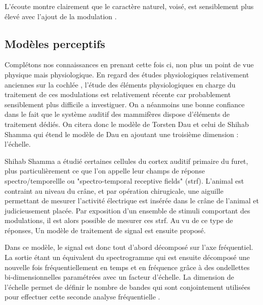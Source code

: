 L'écoute montre clairement que le caractère naturel, voisé, est sensiblement plus élevé avec l'ajout de la modulation .

\subsection{Modèles perceptifs}

Complétons nos connaissances en prenant cette fois ci, non plus un point de vue physique mais physiologique. En regard des études physiologiques relativement anciennes sur la cochlée \cite{}, l'étude des éléments physiologiques en charge du traitement de ces modulations est relativement récente car probablement sensiblement plus difficile a investiguer. On a néanmoins une bonne confiance dans le fait que le système auditif des mammifères dispose d'éléments de traitement dédiés. On citera donc le modèle de Torsten Dau \cite{dau1997modeling} et celui de Shihab Shamma \cite{fritz2003rapid} qui étend le modèle de Dau en ajoutant une troisième dimension : l'échelle.

Shihab Shamma a étudié certaines cellules du cortex auditif primaire du furet, plus particulièrement ce que l'on appelle leur champs de réponse spectro/temporellle ou "spectro-temporal receptive fields" (strf). L'animal est contraint au niveau du crâne, et par opération chirugicale, une aiguille permettant de mesurer l'activité électrique est insérée dans le crâne de l'animal et judicieusement placée. Par exposition d'un ensemble de stimuli comportant des modulations, il est alors possible de mesurer ces strf. Au vu de ce type de réponses, Un modèle de traitement de signal est ensuite proposé.

Dans ce modèle, le signal est donc tout d'abord décomposé sur l'axe fréquentiel. La sortie étant un équivalent du spectrogramme qui est ensuite décomposé une nouvelle fois fréquentiellement en temps et en fréquence grâce à des ondellettes bi-dimensionnelles paramétrées avec un facteur d'échelle. La dimension de l'échelle permet de définir le nombre de bandes qui sont conjointement utilisées pour effectuer cette seconde analyse fréquentielle .


